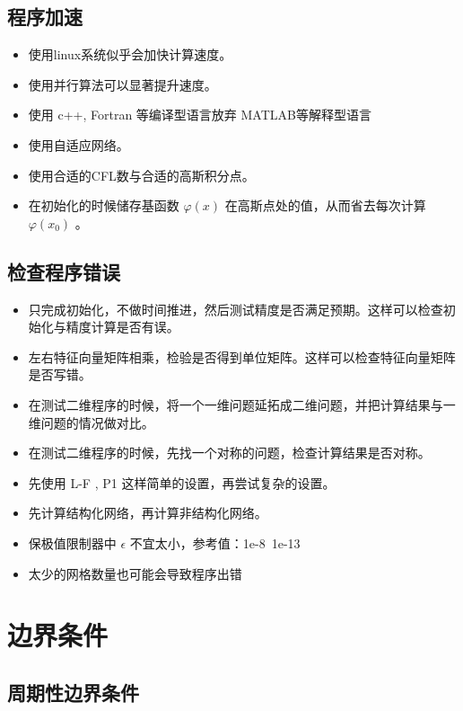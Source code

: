 \documentclass{book}
\begin{document}
\subsection{程序加速}
\begin{itemize}
    \item 使用linux系统似乎会加快计算速度。
    \item 使用并行算法可以显著提升速度。
    \item 使用 c++, Fortran 等编译型语言放弃 MATLAB等解释型语言
    \item 使用自适应网络。
    \item 使用合适的CFL数与合适的高斯积分点。
    \item 在初始化的时候储存基函数 $\varphi(x)$ 在高斯点处的值，从而省去每次计算 $\varphi(x_0)$ 。
\end{itemize}
\subsection{检查程序错误}
\begin{itemize}
    \item 只完成初始化，不做时间推进，然后测试精度是否满足预期。这样可以检查初始化与精度计算是否有误。
    \item 左右特征向量矩阵相乘，检验是否得到单位矩阵。这样可以检查特征向量矩阵是否写错。
    \item 在测试二维程序的时候，将一个一维问题延拓成二维问题，并把计算结果与一维问题的情况做对比。
    \item 在测试二维程序的时候，先找一个对称的问题，检查计算结果是否对称。
    \item 先使用 L-F , P1 这样简单的设置，再尝试复杂的设置。
    \item 先计算结构化网络，再计算非结构化网络。
    \item 保极值限制器中 $\epsilon$ 不宜太小，参考值：1e-8~1e-13
    \item 太少的网格数量也可能会导致程序出错
\end{itemize}

\section{边界条件}
\subsection{周期性边界条件}
\end{document}
